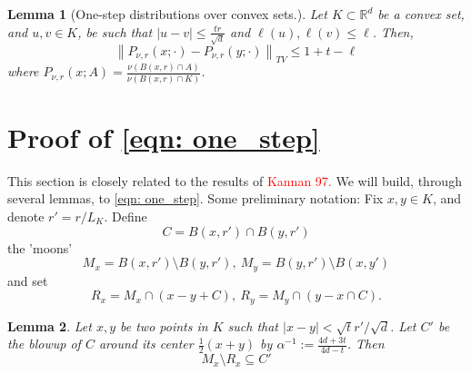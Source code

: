 \documentclass{article}
\newcommand{\Reals}{\mathbb{R}}
\newcommand{\norm}[1]{\left\lVert#1\right\rVert}
\newcommand{\abs}[1]{\left \lvert #1 \right \rvert}
\newcommand{\Rd}{\Reals^d}
\newcommand{\1}{\mathbf{1}}
\theoremstyle{alden}
\theoremstyle{aldenthm}
\newtheorem{lemma}{Lemma}
\theoremstyle{remark}
\begin{document}
\begin{lemma}[One-step distributions over convex sets.]
	\label{lem: one_step_distributions_convex}
	Let $K \subset \Rd$ be a convex set, and $u,v \in K$, be such that $\abs{u - v} \leq \frac{t r}{\sqrt{d}}$ and $\ell(u), \ell(v) \leq \ell$. Then,
	\begin{equation*}
	\norm{P_{\nu,r}(x; \cdot) - P_{\nu,r}(y; \cdot)}_{TV} \leq 1 + t - \ell
	\end{equation*}
	where $P_{\nu,r}(x; A) = \frac{\nu(B(x,r) \cap A)}{\nu(B(x,r) \cap K)}$. 
\end{lemma}

\section{Proof of \eqref{eqn: one_step}}
\label{sec: proof_of_eqn_onestep}
This section is closely related to the results of \textcolor{red}{Kannan 97.}
We will build, through several lemmas, to \eqref{eqn: one_step}. 
Some preliminary notation: Fix $x,y \in K$, and denote $r' = r/ L_K$. Define
\begin{equation*}
C = B(x,r') \cap B(y,r')
\end{equation*}
the 'moons'
\begin{equation*}
M_x = B(x, r') \setminus B(y, r'),~ M_y = B(y,r') \setminus B(x,y')
\end{equation*}
and set
\begin{equation*}
R_x = M_x \cap (x - y + C),~ R_y = M_y \cap (y - x \cap C).
\end{equation*}
\begin{lemma}
	\label{lem: overlap_1}
	Let $x,y$ be two points in $K$ such that $\abs{x - y} < \sqrt{t}r'/\sqrt{d}$. Let $C'$ be the blowup of $C$ around its center $\frac{1}{2}(x + y)$ by $\alpha^{-1} := \frac{4d + 3t}{4d - t}$. Then
	\begin{equation*}
	M_x \setminus R_x \subseteq C'
	\end{equation*}
\end{lemma}
\end{document}
